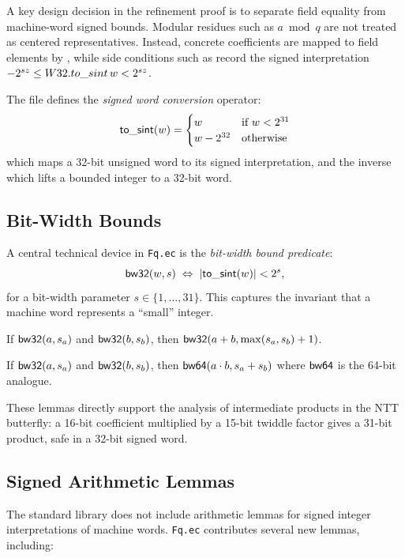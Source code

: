 A key design decision in the refinement proof is to separate field equality
from machine-word signed bounds.  Modular residues such as \(a \bmod q\) are
not treated as centered representatives.  Instead, concrete 
coefficients are mapped to field elements by , while
side conditions such as  record the signed interpretation
\(-2^{sz} \le W32.to\_sint\,w < 2^{sz}\).

The file defines the \emph{signed word conversion} operator:
\[
  \mathsf{to\_sint}(w) = \begin{cases}
    w & \text{if } w < 2^{31} \\
    w - 2^{32} & \text{otherwise}
  \end{cases}
\]
which maps a 32-bit unsigned word to its signed interpretation, and the
inverse  which lifts a bounded integer to a 32-bit word.

\subsection{Bit-Width Bounds}

A central technical device in \texttt{Fq.ec} is the \emph{bit-width bound
predicate}:
\[
  \mathsf{bw32}(w, s) \;\Leftrightarrow\; \left|\mathsf{to\_sint}(w)\right| < 2^s,
\]
for a bit-width parameter $s \in \{1, \dots, 31\}$.  This captures the
invariant that a machine word represents a ``small'' integer.

\begin{lemma}
  If $\mathsf{bw32}(a, s_a)$ and $\mathsf{bw32}(b, s_b)$, then
  $\mathsf{bw32}(a + b, \max(s_a, s_b) + 1)$.
\label{lem:bw_add}
\end{lemma}

\begin{lemma}
  If $\mathsf{bw32}(a, s_a)$ and $\mathsf{bw32}(b, s_b)$, then
  $\mathsf{bw64}(a \cdot b, s_a + s_b)$
  where $\mathsf{bw64}$ is the 64-bit analogue.
\label{lem:bw_mul}
\end{lemma}

These lemmas directly support the analysis of intermediate products in the
NTT butterfly: a 16-bit coefficient multiplied by a 15-bit twiddle factor
gives a 31-bit product, safe in a 32-bit signed word.

\subsection{Signed Arithmetic Lemmas}

The \easycrypt{} standard library does not include arithmetic lemmas for
signed integer interpretations of machine words.  \texttt{Fq.ec} contributes
several new lemmas, including:

